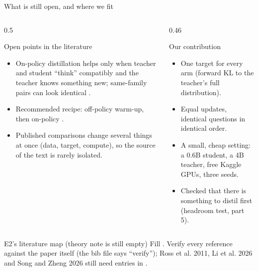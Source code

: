 \begin{frame}{What is still open, and where we fit\hfill\est\ }
  \begin{columns}[T]
    \begin{column}{0.5\textwidth}
      \begin{block}{Open points in the literature}
        \footnotesize
        \begin{itemize}
          \item On-policy distillation helps only when teacher and student
                ``think'' compatibly and the teacher knows something new;
                same-family pairs can look identical
                .
          \item Recommended recipe: off-policy warm-up, then on-policy
                .
          \item Published comparisons change several things at once
                (data, target, compute), so the source of the text is
                rarely isolated.
        \end{itemize}
      \end{block}
    \end{column}
    \begin{column}{0.46\textwidth}
      \begin{block}{Our contribution}
        \footnotesize
        \begin{itemize}
          \item One target for every arm (forward KL to the teacher's full
                distribution).
          \item Equal updates, identical questions in identical order.
          \item A small, cheap setting: a 0.6B student, a 4B teacher,
                free Kaggle GPUs, three seeds.
          \item Checked that there is something to distil first
                (headroom test, part 5).
        \end{itemize}
      \end{block}
    \end{column}
  \end{columns}
  \vspace{0.15cm}
  \begin{todobox}{E2's literature map (theory note is still empty)}
    Fill . Verify every
    reference against the paper itself (the bib file says ``verify''); Ross et al.
    2011, Li et al. 2026 and Song and Zheng 2026 still need entries in
    .
  \end{todobox}
\end{frame}
